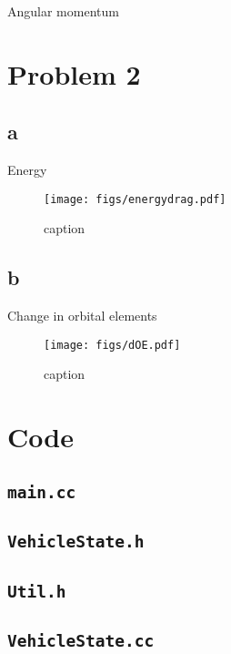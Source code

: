 \documentclass[11pt]{article}
\begin{document}
Angular momentum

\section{Problem 2}

\subsection{a}

Energy

\begin{figure}[h!]
	\centering
	\texttt{[image: figs/energydrag.pdf]}
	\caption{caption}
	\label{fig:energydrag}
\end{figure}

\subsection{b}

Change in orbital elements

\begin{figure}[h!]
	\centering
	\texttt{[image: figs/dOE.pdf]}
	\caption{caption}
	\label{fig:dOE}
\end{figure}

\newpage
\appendix
\section{Code}

\subsection{\texttt{main.cc}}


\subsection{\texttt{VehicleState.h}}


\subsection{\texttt{Util.h}}


\subsection{\texttt{VehicleState.cc}}

\end{document}
